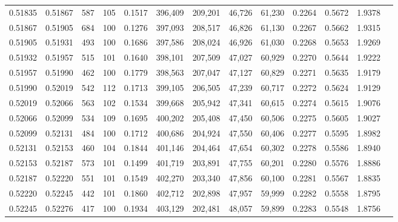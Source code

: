 \begin{tabular}{rrrrrrrrrrrrr}
0.51835 & 0.51867 &   587 & 105 &                                     0.1517 & 396,409 & 209,201 &  46,726 &  61,230 & 0.2264 & 0.5672 & 1.9378 \\
0.51867 & 0.51905 &   684 & 100 &                                     0.1276 & 397,093 & 208,517 &  46,826 &  61,130 & 0.2267 & 0.5662 & 1.9315 \\
0.51905 & 0.51931 &   493 & 100 &                                     0.1686 & 397,586 & 208,024 &  46,926 &  61,030 & 0.2268 & 0.5653 & 1.9269 \\
0.51932 & 0.51957 &   515 & 101 &                                     0.1640 & 398,101 & 207,509 &  47,027 &  60,929 & 0.2270 & 0.5644 & 1.9222 \\
0.51957 & 0.51990 &   462 & 100 &                                     0.1779 & 398,563 & 207,047 &  47,127 &  60,829 & 0.2271 & 0.5635 & 1.9179 \\
0.51990 & 0.52019 &   542 & 112 &                                     0.1713 & 399,105 & 206,505 &  47,239 &  60,717 & 0.2272 & 0.5624 & 1.9129 \\
0.52019 & 0.52066 &   563 & 102 &                                     0.1534 & 399,668 & 205,942 &  47,341 &  60,615 & 0.2274 & 0.5615 & 1.9076 \\
0.52066 & 0.52099 &   534 & 109 &                                     0.1695 & 400,202 & 205,408 &  47,450 &  60,506 & 0.2275 & 0.5605 & 1.9027 \\
0.52099 & 0.52131 &   484 & 100 &                                     0.1712 & 400,686 & 204,924 &  47,550 &  60,406 & 0.2277 & 0.5595 & 1.8982 \\
0.52131 & 0.52153 &   460 & 104 &                                     0.1844 & 401,146 & 204,464 &  47,654 &  60,302 & 0.2278 & 0.5586 & 1.8940 \\
0.52153 & 0.52187 &   573 & 101 &                                     0.1499 & 401,719 & 203,891 &  47,755 &  60,201 & 0.2280 & 0.5576 & 1.8886 \\
0.52187 & 0.52220 &   551 & 101 &                                     0.1549 & 402,270 & 203,340 &  47,856 &  60,100 & 0.2281 & 0.5567 & 1.8835 \\
0.52220 & 0.52245 &   442 & 101 &                                     0.1860 & 402,712 & 202,898 &  47,957 &  59,999 & 0.2282 & 0.5558 & 1.8795 \\
0.52245 & 0.52276 &   417 & 100 &                                     0.1934 & 403,129 & 202,481 &  48,057 &  59,899 & 0.2283 & 0.5548 & 1.8756 \\

\end{tabular}
